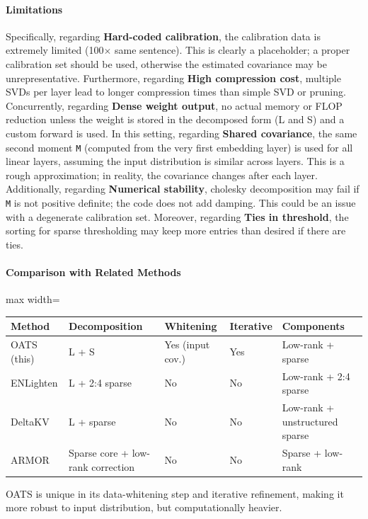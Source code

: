 \paragraph{Limitations}

Specifically, regarding \textbf{Hard-coded calibration}, the calibration data is extremely limited (100$\times$ same sentence). This is clearly a placeholder; a proper calibration set should be used, otherwise the estimated covariance may be unrepresentative. Furthermore, regarding \textbf{High compression cost}, multiple SVDs per layer lead to longer compression times than simple SVD or pruning. Concurrently, regarding \textbf{Dense weight output}, no actual memory or FLOP reduction unless the weight is stored in the decomposed form (L and S) and a custom forward is used. In this setting, regarding \textbf{Shared covariance}, the same second moment \texttt{M} (computed from the very first embedding layer) is used for all linear layers, assuming the input distribution is similar across layers. This is a rough approximation; in reality, the covariance changes after each layer. Additionally, regarding \textbf{Numerical stability}, cholesky decomposition may fail if \texttt{M} is not positive definite; the code does not add damping. This could be an issue with a degenerate calibration set. Moreover, regarding \textbf{Ties in threshold}, the sorting for sparse thresholding may keep more entries than desired if there are ties.


\paragraph{Comparison with Related Methods}

\begin{center}
\begin{adjustbox}{max width=\columnwidth}
\renewcommand{\arraystretch}{1.2}
\begin{tabular}{lllll}
\toprule
Method & Decomposition & Whitening & Iterative & Components \\
\midrule
OATS (this) & L + S & Yes (input cov.) & Yes & Low-rank + sparse \\
ENLighten & L + 2:4 sparse & No & No & Low-rank + 2:4 sparse \\
DeltaKV & L + sparse & No & No & Low-rank + unstructured sparse \\
ARMOR & Sparse core + low-rank correction & No & No & Sparse + low-rank \\

\bottomrule
\end{tabular}
\end{adjustbox}
\end{center}
OATS is unique in its data-whitening step and iterative refinement, making it more robust to input distribution, but computationally heavier.


